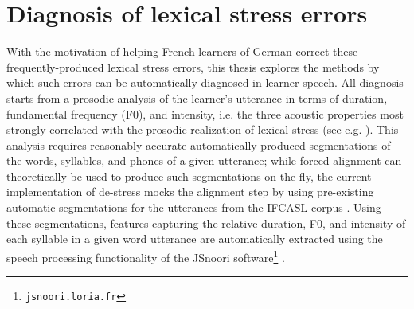 \documentclass[11pt,a4paper,onecolumn]{article}
\newcommand{\TODO}[1]{{\color{red}\textbf{[TODO #1]}}}
\begin{document}
\section{Diagnosis of lexical stress errors}
\label{sec:diag}

With the motivation of helping French learners of German correct these frequently-produced lexical stress errors, this thesis explores the methods by which such errors can be automatically diagnosed in learner speech. 
%
All diagnosis starts from a prosodic analysis of the learner's utterance in terms of duration, fundamental frequency (F0), and intensity, i.e. the three acoustic properties most strongly correlated with the prosodic realization of lexical stress (see e.g. \cite{Dogil1999,Cutler2005}). %
This analysis requires reasonably accurate automatically-produced segmentations of the words, syllables, and phones of a given utterance; while forced alignment can theoretically be used to produce such segmentations on the fly, the current implementation of de-stress mocks the alignment step by using pre-existing automatic segmentations for the utterances from the IFCASL corpus \citep{Fauth2014}.
Using these segmentations, features capturing the relative duration, F0, and intensity of each syllable in a given word utterance are automatically extracted using the speech processing functionality of the JSnoori software\footnote{\texttt{jsnoori.loria.fr}} \citep{Laprie1999,DiMartino1999}.

	
	
	
\end{document}
